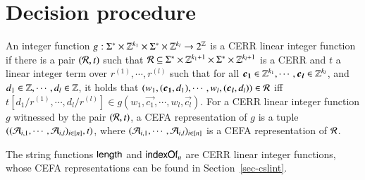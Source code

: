 \documentclass{llncs}
\begin{document}


\section{Decision procedure}


\begin{definition}
An integer function $g: \Sigma^* \times \mathbb{Z}^{k_1} \times \Sigma^* \times \mathbb{Z}^{k_l} \rightarrow 2^{\mathbb{Z}}$ is a CERR linear integer function if there is a pair $(\mathcal{R}, t)$ such that $\mathcal{R} \subseteq \Sigma^* \times \mathbb{Z}^{k_1+1} \times \Sigma^* \times \mathbb{Z}^{k_l+1}$ is a CERR and $t$ a linear integer term over $r^{(1)}, \cdots, r^{(l)}$ such that for all $\vec{c_1} \in \intnum^{k_1}, \cdots, \vec{c_l} \in \intnum^{k_l}$, and $d_1 \in \mathbb{Z}, \cdots, d_l \in \mathbb{Z}$, it holds that $(w_1, (\vec{c_1}, d_1), \cdots, w_l, (\vec{c_l}, d_l)) \in \cR$ iff $t[d_1/r^{(1)}, \cdots, d_l/r^{(l)}] \in g(w_1, \vec{c_1}, \cdots, w_l, \vec{c_l})$.  For a CERR linear integer function $g$ witnessed by the pair $(\mathcal{R}, t)$, a CEFA representation of $g$ is a tuple $((\mathcal{A}_{i,1}, \cdots, \mathcal{A}_{i, l})_{i \in [n]}, t)$, where $(\mathcal{A}_{i,1}, \cdots, \mathcal{A}_{i, l})_{i \in [n]}$ is a CEFA representation of $\mathcal{R}$.

\end{definition}

\begin{example}
The string functions $\mathsf{length}$ and $\mathsf{indexOf}_u$ are CERR linear integer functions, whose CEFA representations can be found in Section~\ref{sec-cslint}.
\end{example}
\end{document}
